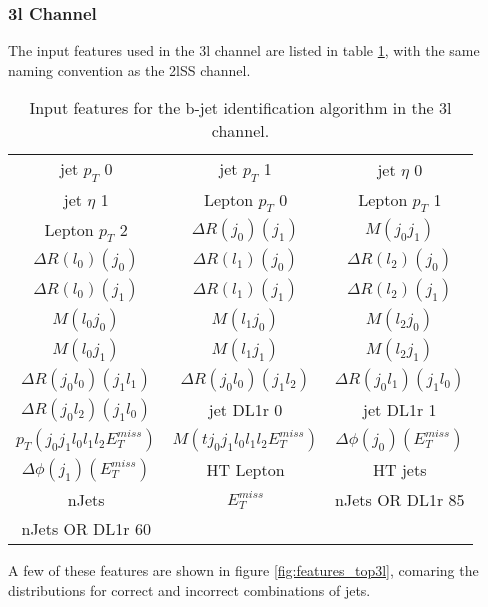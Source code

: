 \subsubsection{3l Channel}
\label{subsec:top3l}
 
The input features used in the 3l channel are listed in table \ref{tab:top3lfeatures}, with the same naming convention as the 2lSS channel.

\begin{table}[h!]
  \begin{center}
  \begin{tabular}{ccc}
    jet  $p_T$ 0 & jet  $p_T$ 1 & jet  $\eta$ 0 \\
    jet  $\eta$ 1 & Lepton  $p_T$ 0 & Lepton  $p_T$ 1 \\
    Lepton  $p_T$ 2 & $\Delta R(j_0)(j_1)$ & $M(j_0j_1)$ \\
    $\Delta R(l_0)(j_0)$ & $\Delta R(l_1)(j_0)$ & $\Delta R(l_2)(j_0)$ \\
    $\Delta R(l_0)(j_1)$ & $\Delta R(l_1)(j_1)$ & $\Delta R(l_2)(j_1)$ \\
    $M(l_0j_0)$ & $M(l_1j_0)$ & $M(l_2j_0)$ \\
    $M(l_0j_1)$ & $M(l_1j_1)$ & $M(l_2j_1)$ \\
    $\Delta R(j_0l_0)(j_1l_1)$ & $\Delta R(j_0l_0)(j_1l_2)$ & $\Delta R(j_0l_1)(j_1l_0)$ \\
    $\Delta R(j_0l_2)(j_1l_0)$ & jet DL1r 0 & jet DL1r 1 \\
     $p_T(j_0j_1l_0l_1l_2E_T^{miss})$ & $M(tj_0j_1l_0l_1l_2E_T^{miss})$ & $\Delta\phi(j_0)(E_T^{miss})$ \\
    $\Delta\phi(j_1)(E_T^{miss})$ & HT Lepton & HT jets \\
    nJets & $E_T^{miss}$ & nJets OR DL1r 85 \\
    nJets OR DL1r 60 & & \\
  \end{tabular}
  \end{center}
  \caption{Input features for the b-jet identification algorithm in the 3l channel.}
  \label{tab:top3lfeatures}
\end{table}

A few of these features are shown in figure \ref{fig:features_top3l}, comaring the distributions for correct and incorrect combinations of jets.

